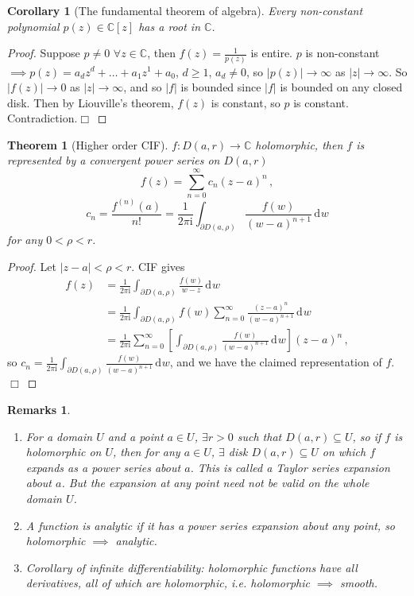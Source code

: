 \documentclass{article}
\theoremstyle{plain}\theoremheaderfont{\normalfont\itshape}\theorembodyfont{\rmfamily}\theoremseparator{.}\newtheorem*{rem}{Remark}\newtheorem*{ex}{Example}\newtheorem*{proof}{Proof}\newtheorem*{altp}{Alternative proof}\newtheorem*{con}{Consequences}\newtheorem*{notn}{Notations}\newtheorem*{cau}{Caution}\newtheorem*{term}{Terminology}\newtheorem*{keyex}{Key example}
\theoremstyle{plain}\theoremheaderfont{\normalfont\bfseries}\theorembodyfont{\rmfamily}\theoremseparator{.}\newtheorem{thm}{Theorem}[section]\newtheorem{lem}[thm]{Lemma}\newtheorem{prop}[thm]{Proposition}\newtheorem*{cor}{Corollary}\newtheorem{defn}[thm]{Definition}\newtheorem{clm}[thm]{Claim}\newtheorem{clminproof}{Claim}\newtheorem{leminproof}{Lemma}\newtheorem{app}{Application}
\theoremstyle{break}\theoremheaderfont{\normalfont\itshape}\theorembodyfont{\rmfamily}\theoremseparator{.\medskip}\newtheorem*{proofskip}{Proof}\newtheorem*{exs}{Examples}\newtheorem*{rems}{Remarks}\newtheorem*{rec}{Recall}\newtheorem*{ppts}{Properties}
\theoremstyle{break}\theoremheaderfont{\normalfont\bfseries}\theorembodyfont{\rmfamily}\theoremseparator{.\medskip}\newtheorem{lemskip}[thm]{Lemma}\newtheorem{defnskip}[thm]{Definition}\newtheorem{propskip}[thm]{Proposition}\newtheorem{thmskip}[thm]{Theorem}
\numberwithin{equation}{section}
\newcommand{\ii}{\mathrm{i}}
\newcommand{\qed}{\hfill\ensuremath{\Box}}
\newcommand{\abs}[1]{\left|#1\right|}
\newcommand{\dd}[2][]{\,\mathrm{d}^{#1} #2}
\newcommand{\CC}{\mathbb{C}}
\begin{document}
    \begin{cor}[The fundamental theorem of algebra]
        Every non-constant polynomial \(p(z)\in\CC[z]\) has a root in \(\CC\).
    \end{cor}
    \begin{proof}
        Suppose \(p\ne 0\) \(\forall z\in\CC\), then \(f(z)=\frac{1}{p(z)}\) is entire. \(p\) is non-constant \(\implies p(z)=a_dz^d+\dots +a_1z^1+a_0\), \(d\ge 1\), \(a_d\ne 0\), so \(\abs{p(z)}\to\infty\) as \(\abs{z}\to \infty\). So \(\abs{f(z)}\to 0\) as \(\abs{z}\to\infty\), and so \(\abs{f}\) is bounded since \(\abs{f}\) is bounded on any closed disk. Then by Liouville's theorem, \(f(z)\) is constant, so \(p\) is constant. Contradiction.\qed
    \end{proof}
    \begin{thm}[Higher order CIF]
        \(f:D(a,r)\to\CC\) holomorphic, then \(f\) is represented by a convergent power series on \(D(a,r)\)
        \[f(z)=\sum_{n=0}^{\infty}c_n(z-a)^n\,,\]
        \[c_n=\frac{f^{(n)}(a)}{n!}=\frac{1}{2\pi \ii}\int_{\partial D(a,\rho)}\frac{f(w)}{(w-a)^{n+1}}\dd{w}\]
        for any \(0<\rho<r\).
    \end{thm}
    \begin{proof}
        Let \(\abs{z-a}<\rho<r\). CIF gives
        \begin{align*}
            f(z)&=\frac{1}{2\pi \ii}\int_{\partial D(a,\rho)}\frac{f(w)}{w-z}\dd{w}\\
            &=\frac{1}{2\pi \ii}\int_{\partial D(a,\rho)}f(w)\sum_{n=0}^{\infty}\frac{(z-a)^n}{(w-a)^{n+1}}\dd{w}\\
            &=\frac{1}{2\pi \ii}\sum_{n=0}^{\infty}\left[\int_{\partial D(a,\rho)} \frac{f(w)}{(w-a)^{n+1}}\dd{w}\right](z-a)^n\,,
        \end{align*}
        so \(c_n=\frac{1}{2\pi \ii}\int_{\partial D(a,\rho)}\frac{f(w)}{(w-a)^{n+1}}\dd{w}\), and we have the claimed representation of \(f\).\qed
    \end{proof}
    \begin{rems}
        \begin{enumerate}[topsep=0pt,label=(\roman*)]
            \item For a domain \(U\) and a point \(a\in U\), \(\exists r>0\) such that \(D(a,r)\subseteq U\), so if \(f\) is holomorphic on \(U\), then for any \(a\in U\), \(\exists\) disk \(D(a,r)\subseteq U\) on which \(f\) expands as a power series about \(a\). This is called a \textit{Taylor series expansion} about \(a\). But the expansion at any point need not be valid on the whole domain \(U\).
            \item A function is \textit{analytic} if it has a power series expansion about any point, so holomorphic \(\implies\) analytic.
            \item Corollary of infinite differentiability: holomorphic functions have all derivatives, all of which are holomorphic, i.e. holomorphic \(\implies\) smooth.
        \end{enumerate}
    \end{rems}
\end{document}
